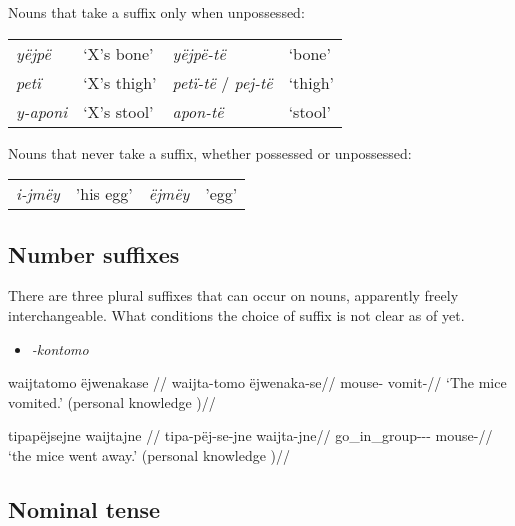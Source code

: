 \documentclass{memoir}
\begin{document}
\ex\label{suffunpossessed} Nouns that take a suffix only when
unpossessed:

\begin{tabular}[t]{llll}

  \emph{yëjpë} &  ‘X’s bone’ &                \emph{yëjpë-të} &  ‘bone’ \\

   \emph{petï} & ‘X’s thigh’ & \emph{petï-të} / \emph{pej-të} & ‘thigh’ \\
\emph{y-aponi} & ‘X’s stool’ &                 \emph{apon-të} & ‘stool’ \\

\end{tabular}
 \xe

\ex\label{unsuffixednouns} Nouns that never take a suffix, whether
possessed or unpossessed:

\begin{tabular}[t]{llll}

\emph{i-jmëy} & 'his egg’ & \emph{ëjmëy} & 'egg’ \\

\end{tabular}
 \xe

\subsection{\texorpdfstring{Number suffixes
\label{sec:nominalnumber}}{Number suffixes }}

There are three plural suffixes that can occur on nouns, apparently
freely interchangeable. What conditions the choice of suffix is not
clear as of yet.

\begin{itemize}
\tightlist
\item
  \emph{-kontomo}
\end{itemize}

\ex \label{ctorat-17}
\begingl \glpreamble waijtatomo ëjwenakase //
\gla waijta-tomo ëjwenaka-se//
\glb mouse- vomit-//
\glft ‘The mice vomited.’ (personal knowledge
)//
\endgl
\xe

\ex \label{ctorat-40}
\begingl \glpreamble tipapëjsejne waijtajne //
\gla tipa-pëj-se-jne waijta-jne//
\glb go\_in\_group--- mouse-//
\glft ‘the mice went away.’ (personal knowledge
)//
\endgl
\xe

\subsection{\texorpdfstring{Nominal tense
\label{sec:nominaltense}}{Nominal tense }}
\end{document}
